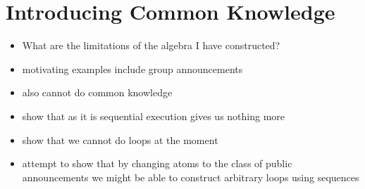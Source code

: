 \section{Introducing Common Knowledge}
\begin{itemize}
	\item What are the limitations of the algebra I have constructed?
	\item motivating examples include group announcements
	\item also cannot do common knowledge
	\item show that as it is sequential execution gives us nothing more
	\item show that we cannot do loops at the moment
	\item attempt to show that by changing atoms to the class of public announcements we might be able
	to construct arbitrary loops using sequences
\end{itemize}
